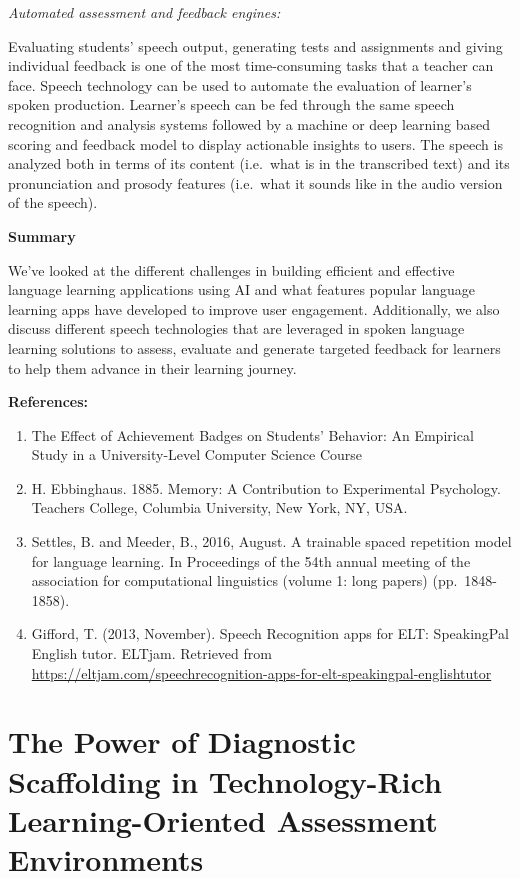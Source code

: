 \documentclass[
]{book}
\begin{document}
\emph{Automated assessment and feedback engines:}

Evaluating students' speech output, generating tests and assignments and giving individual feedback is one of the most time-consuming tasks that a teacher can face. Speech technology can be used to automate the evaluation of learner's spoken production. Learner's speech can be fed through the same speech recognition and analysis systems followed by a machine or deep learning based scoring and feedback model to display actionable insights to users. The speech is analyzed both in terms of its content (i.e.~what is in the transcribed text) and its pronunciation and prosody features (i.e.~what it sounds like in the audio version of the speech).

\textbf{Summary}

We've looked at the different challenges in building efficient and effective language learning applications using AI and what features popular language learning apps have developed to improve user engagement. Additionally, we also discuss different speech technologies that are leveraged in spoken language learning solutions to assess, evaluate and generate targeted feedback for learners to help them advance in their learning journey.

\textbf{References:}

\begin{enumerate}
\def\labelenumi{\arabic{enumi}.}
\item
  The Effect of Achievement Badges on Students' Behavior: An Empirical Study in a University-Level Computer Science Course
\item
  H. Ebbinghaus. 1885. Memory: A Contribution to Experimental Psychology. Teachers College,
  Columbia University, New York, NY, USA.
\item
  Settles, B. and Meeder, B., 2016, August. A trainable spaced repetition model for language learning. In Proceedings of the 54th annual meeting of the association for computational linguistics (volume 1: long papers) (pp.~1848-1858).
\item
  Gifford, T. (2013, November). Speech Recognition apps for ELT: SpeakingPal English tutor. ELTjam. Retrieved from \url{https://eltjam.com/speechrecognition-apps-for-elt-speakingpal-englishtutor}
\end{enumerate}

\newpage

\hypertarget{the-power-of-diagnostic-scaffolding-in-technology-rich-learning-oriented-assessment-environments}{%
\section{The Power of Diagnostic Scaffolding in Technology-Rich Learning-Oriented Assessment Environments}\label{the-power-of-diagnostic-scaffolding-in-technology-rich-learning-oriented-assessment-environments}}
\end{document}
